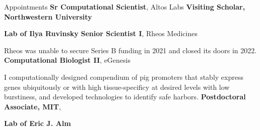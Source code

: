 \begin{rubric}{Appointments}
		\textbf{Sr Computational Scientist}, Altos Labs
	\textbf{Visiting Scholar, Northwestern University}\par
	\textbf{Lab of Ilya Ruvinsky}
\entry*[03/2021 - 01/2022]
	\textbf{Senior Scientist I}, Rheos Medicines\par
	Rheos was unable to secure Series B funding in 2021 and closed its doors in 2022.
\entry*[11/2019 - 3/2021]
	\textbf{Computational Biologist II}, eGenesis\par
	I computationally designed compendium of pig promoters that stably
	express genes ubiquitously or with high tissue-specificy at desired levels with
	low burstiness, and developed technologies to identify safe harbors.
\entry*[01/2019--11/2019]
		\textbf{Postdoctoral Associate, MIT},\par
		\textbf{Lab of Eric J. Alm}
\end{rubric}

